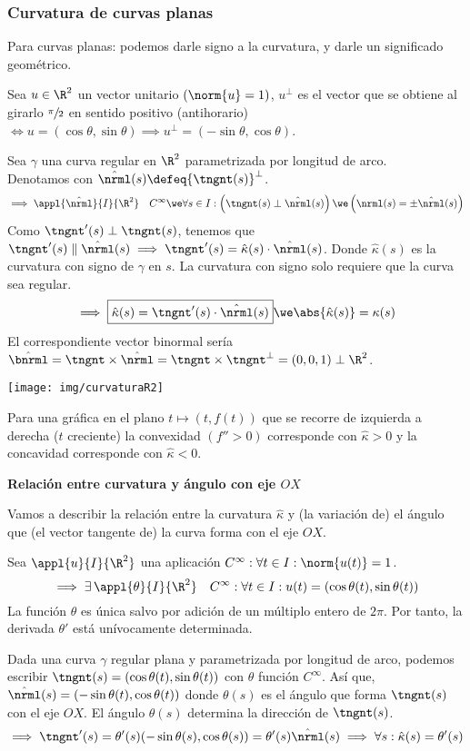 \subsubsection{Curvatura de curvas planas}

Para curvas planas: podemos darle signo a la curvatura, y darle un significado geométrico.
\begin{defn}
	Sea $u \in \R^2$ un vector unitario $(\norm{u}=1)$, $u^\perp$ es el vector que se obtiene al girarlo $\sfrac{\pi}{2}$ en sentido positivo (antihorario) $\iff u=(\cos{\theta}, \sin{\theta}) \implies u^\perp=(-\sin{\theta}, \cos{\theta})$.
\end{defn}
Sea $\gamma$ una curva regular en $\R^2$ parametrizada por longitud de arco. \\
Denotamos con $\hat{\nrml}(s)\defeq{\tngnt(s)}^\perp$.
\[\implies \appl{\hat{\nrml}}{I}{\R^2} \quad C^\infty \we \forall s \in I : \left(\tngnt(s) \perp \hat{\nrml}(s)\right) \we \left(\nrml(s)=\pm \hat{\nrml}(s)\right)\]
Como $\tngnt'(s) \perp \tngnt(s)$, tenemos que $\tngnt'(s) \parallel \hat{\nrml}(s) \implies \tngnt'(s) = \hat{\kappa}(s) \cdot \hat{\nrml}(s)$. Donde $\hat{\kappa}(s)$ es la curvatura con signo de $\gamma$ en $s$.
La curvatura con signo solo requiere que la curva sea regular.
\[\implies \boxed{\hat{\kappa}(s)=\tngnt'(s)\cdot\hat{\nrml}(s)} \we \abs{\hat{\kappa}(s)}=\kappa(s)\]
El correspondiente vector binormal sería $\hat{\bnrml}=\tngnt\times\hat{\nrml}=\tngnt\times\tngnt^\perp=(0, 0, 1) \perp \R^2$.
\begin{center}
	\texttt{[image: img/curvaturaR2]}
\end{center}
Para una gráfica en el plano $t\mapsto (t, f(t))$ que se recorre de izquierda a derecha ($t$ creciente) la convexidad $(f'' > 0)$ corresponde con $\hat{\kappa} > 0$ y la concavidad corresponde con $\hat{\kappa} < 0$.

\textbf{Relación entre curvatura y ángulo con eje $OX$}

Vamos a describir la relación entre la curvatura $\hat{\kappa}$ y (la variación de) el ángulo que (el vector tangente de) la curva forma con el eje $OX$.

\begin{lem}
	Sea $\appl{u}{I}{\R^2}$ una aplicación $C^\infty : \forall t\in I : \norm{u(t)} = 1$.
	\[\implies \exists\, \appl{\theta}{I}{\R^2} \quad C^\infty : \forall t \in I : u(t)=(\cos{\theta(t)}, \sin{\theta(t)})\]
	La función $\theta$ es única salvo por adición de un múltiplo entero de $2\pi$. Por tanto, la derivada $\theta'$ está unívocamente determinada.
\end{lem}
Dada una curva $\gamma$ regular plana y parametrizada por longitud de arco, podemos escribir $\tngnt(s)=(\cos{\theta(t)}, \sin{\theta(t)})$ con $\theta$ función $C^\infty$. Así que, $\hat{\nrml}(s)=(-\sin{\theta(t)}, \cos{\theta(t)})$ donde $\theta(s)$ es el ángulo que forma $\tngnt(s)$ con el eje $OX$. El ángulo $\theta(s)$ determina la dirección de $\tngnt(s)$.
\[\implies \tngnt'(s)=\theta'(s)(-\sin{\theta(s)}, \cos{\theta(s)})=\theta'(s) \hat{\nrml}(s) \implies \forall s : \hat{\kappa}(s) = \theta'(s)\]

